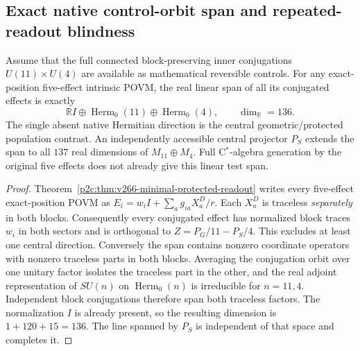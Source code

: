 \documentclass[12pt,a4paper]{article}
\begin{document}
\subsection{Exact native control-orbit span and repeated-readout blindness}
\label{p4a:sec:v266-readout-orbit}
\begin{theorem}
\label{p4a:thm:v266-controlled-span}
Assume that the full connected block-preserving inner conjugations
$U(11)\times U(4)$ are available as mathematical reversible controls.
For any exact-position five-effect intrinsic POVM, the real linear span
of all its conjugated effects is exactly
\[
\boxed{\mathbb RI\oplus\operatorname{Herm}_0(11)
\oplus\operatorname{Herm}_0(4),\qquad \dim_{\mathbb R}=136.}
\]
The single absent native Hermitian direction is the central
geometric/protected population contrast. An independently accessible
central projector $P_S$ extends the span to all $137$ real dimensions
of $M_{11}\oplus M_4$. Full C$^*$-algebra generation by the original
five effects does not already give this linear test span.
\end{theorem}
\begin{proof}
Theorem~\ref{p2c:thm:v266-minimal-protected-readout} writes every
five-effect exact-position POVM as
$E_i=w_iI+\sum_ag_{ia}X_a^D/r$. Each $X_a^D$ is traceless
\emph{separately} in both blocks. Consequently every conjugated effect
has normalized block traces $w_i$ in both sectors and is orthogonal to
$Z=P_G/11-P_S/4$. This excludes at least one central direction.
Conversely the span contains nonzero coordinate operators with nonzero
traceless parts in both blocks. Averaging the conjugation orbit over
one unitary factor isolates the traceless part in the other, and the
real adjoint representation of $SU(n)$ on $\operatorname{Herm}_0(n)$
is irreducible for $n=11,4$. Independent block conjugations therefore
span both traceless factors. The normalization $I$ is already present,
so the resulting dimension is $1+120+15=136$. The line spanned by
$P_S$ is independent of that space and completes it.
\end{proof}
\end{document}
